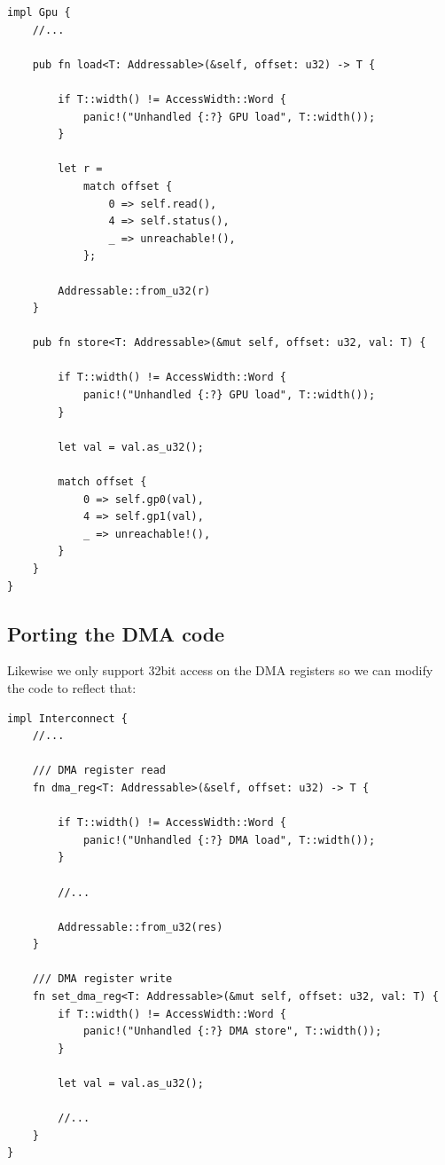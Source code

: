\documentclass[a4paper]{article}
\begin{document}
\begin{lstlisting}
impl Gpu {
    //...

    pub fn load<T: Addressable>(&self, offset: u32) -> T {

        if T::width() != AccessWidth::Word {
            panic!("Unhandled {:?} GPU load", T::width());
        }

        let r =
            match offset {
                0 => self.read(),
                4 => self.status(),
                _ => unreachable!(),
            };

        Addressable::from_u32(r)
    }

    pub fn store<T: Addressable>(&mut self, offset: u32, val: T) {

        if T::width() != AccessWidth::Word {
            panic!("Unhandled {:?} GPU load", T::width());
        }

        let val = val.as_u32();

        match offset {
            0 => self.gp0(val),
            4 => self.gp1(val),
            _ => unreachable!(),
        }
    }
}
\end{lstlisting}

\subsection{Porting the DMA code}

Likewise we only support 32bit access on the DMA registers so we can
modify the code to reflect that:

\begin{lstlisting}
impl Interconnect {
    //...

    /// DMA register read
    fn dma_reg<T: Addressable>(&self, offset: u32) -> T {

        if T::width() != AccessWidth::Word {
            panic!("Unhandled {:?} DMA load", T::width());
        }

        //...

        Addressable::from_u32(res)
    }

    /// DMA register write
    fn set_dma_reg<T: Addressable>(&mut self, offset: u32, val: T) {
        if T::width() != AccessWidth::Word {
            panic!("Unhandled {:?} DMA store", T::width());
        }

        let val = val.as_u32();

        //...
    }
}
\end{lstlisting}
\end{document}
